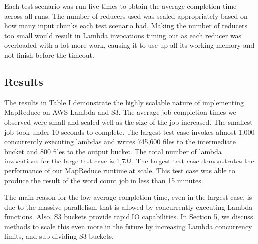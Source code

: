 Each test scenario was run five times to obtain the average completion time across all runs. The number of reducers used was scaled appropriately based on how many input chunks each test scenario had. Making the number of reducers too small would result in Lambda invocations timing out as each reducer was overloaded with a lot more work, causing it to use up all its working memory and not finish before the timeout.

\subsection{Results}

The results in Table I demonstrate the highly scalable nature of implementing MapReduce on AWS Lambda and S3. The average job completion times we observed were small and scaled well as the size of the job increased. The smallest job took under 10 seconds to complete. The largest test case invokes almost 1,000 concurrently executing lambdas and writes 745,600 files to the intermediate bucket and 800 files to the output bucket. The total number of lambda invocations for the large test case is 1,732. The largest test case demonstrates the performance of our MapReduce runtime at scale. This test case was able to produce the result of the word count job in less than 15 minutes.

The main reason for the low average completion time, even in the largest case, is due to the massive parallelism that is allowed by concurrently executing Lambda functions. Also, S3 buckets provide rapid IO capabilities. In Section 5, we discuss methods to scale this even more in the future by increasing Lambda concurrency limits, and sub-dividing S3 buckets.